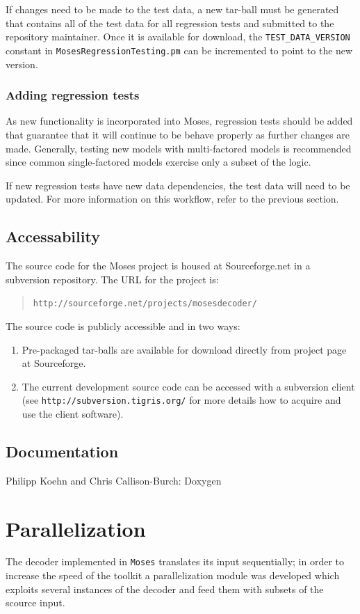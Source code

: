 \documentclass[10pt]{report}
\theoremstyle{plain}
\begin{document}
{If changes need to be made to the test data, a new tar-ball must be
generated that contains all of the test data for all regression
tests and submitted to the repository maintainer.  Once it is
available for download, the \texttt{TEST\_DATA\_VERSION} constant in
\texttt{MosesRegressionTesting.pm} can be incremented to point to
the new version.

\subsubsection{Adding regression tests}
As new functionality is incorporated into Moses, regression tests
should be added that guarantee that it will continue to be behave
properly as further changes are made.  Generally, testing new models
with multi-factored models is recommended since common
single-factored models exercise only a subset of the logic.

If new regression tests have new data dependencies, the test data
will need to be updated.  For more information on this workflow,
refer to the previous section.

\subsection{Accessability}
The source code for the Moses project is housed at Sourceforge.net
in a subversion repository.  The URL for the project is:

\begin{quote}
    \texttt{http://sourceforge.net/projects/mosesdecoder/}
\end{quote}

The source code is publicly accessible and in two ways:
\begin{enumerate}
  \item Pre-packaged tar-balls are available for download directly
  from project page at Sourceforge.
  \item The current development source code can be accessed with a subversion client (see \texttt{http://subversion.tigris.org/}
for more details how to acquire and use the client software).
\end{enumerate}


\subsection{Documentation}
{\sc Philipp Koehn and Chris Callison-Burch: Doxygen}

\section{Parallelization}
The decoder implemented in {\tt Moses} translates its input sequentially; in order to increase 
the speed of the toolkit a parallelization module was developed which exploits several instances of the decoder and feed them with subsets of the scource input.


}
\end{document}

